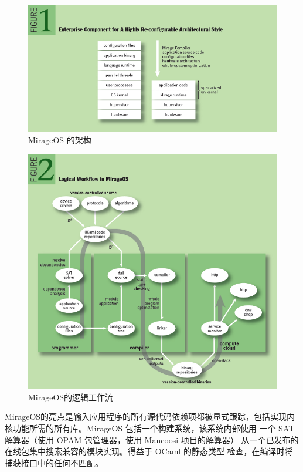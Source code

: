 \documentclass{../runikraft-report}
\begin{document}
\begin{figure}[!hbt]
\includegraphics[width=\linewidth]{assets/figure1.png}
\caption{MirageOS 的架构}\label{fig:mirage-fig1}
\end{figure}

\begin{figure}[!hbt]
\includegraphics[width=\linewidth]{assets/figure2.png}
\caption{MirageOS的逻辑工作流}\label{fig:mirage-fig2}
\end{figure}

MirageOS的亮点是输入应用程序的所有源代码依赖项都被显式跟踪，包括实现内
核功能所需的所有库。MirageOS 包括一个构建系统，该系统内部使用
一个 SAT 解算器（使用 OPAM 包管理器，使用 Mancoosi 项目的解算器）
从一个已发布的在线包集中搜索兼容的模块实现。得益于 OCaml 的静态类型
检查，在编译时将捕获接口中的任何不匹配。
\end{document}
